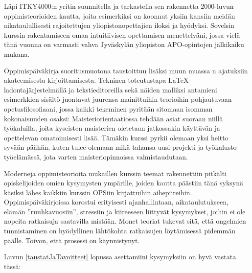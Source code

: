 \documentclass[utf8]{gradu3}
\begin{document}
Läpi ITKY4000:n yritin suunnitella ja tarkastella sen rakennetta
2000-luvun oppimisteorioiden kautta, joita esimerkiksi
\textcite{Illeris2009contemporaryTheories} on koonnut yksiin kansiin
meidän aikataulullisesti rajoitettujen yliopistonopettajien iloksi ja
hyödyksi. Sovelsin kurssin rakentamiseen omaa intuitiivisen
opettamisen menettelyäni, jossa vielä tänä vuonna on varmasti vahva
Jyväskylän yliopiston APO-opintojen
\parencite{LaineMalinen2009elavaPeilisali} jälkikaiku mukana.

Oppimispäiväkirja suoritusmuotona taustoittuu lisäksi muun muassa
\citeauthor{Badley2009shapingAndReshaping}n
\parencite*{Badley2009shapingAndReshaping} ajatuksiin akateemisesta
kirjoittamisesta. Tekninen toteutustapa \LaTeX -ladontajärjestelmällä
ja tekstieditoreilla sekä näiden malliksi antamieni esimerkkien
sisältö juontavat juurensa mainittuihin teorioihin pohjautuvaan
opetusfilosofiaani, jossa kaikki tekeminen pyritään sitomaan isomman
kokonaisuuden osaksi: Maisteriorientaatiossa tehdään asiat suoraan
niillä työkaluilla, joita kyseisten maisterien oletetaan jatkossakin
käyttävän ja opettelevan omatoimisesti lisää. Tämäkin kurssi pyrkii
olemaan yksi heitto syvään päähän, kuten tulee olemaan mikä tahansa
uusi projekti ja työkalusto työelämässä, jota varten
maisteriopinnoissa valmistaudutaan.

Moderneja oppimisteorioita mukaillen kurssin teemat rakennettiin
pitkälti opiskelijoiden omien kysymysten ympärille, joiden kautta
päästiin tänä syksynä käsiksi lähes kaikkiin kurssin OPSiin
kirjattuihin aihepiireihin. Oppimispäiväkirjoissa korostui erityisesti
ajanhallintaan, aikataulutukseen, elämän ''ruuhkavuosiin'', stressiin
ja kiireeseen liittyvät kysymykset, joihin ei ole nopeita ratkaisuja
saatavilla mistään. Monet teoriat
\parencite[edelleen erityisesti][]{Illeris2009contemporaryTheories} tukevat sitä, että
ongelmien tunnistaminen on hyödyllinen lähtökohta ratkaisujen
löytämisessä pidemmän päälle. Toivon, että prosessi on käynnistynyt.

Luvun \ref{taustatJaTavoitteet} lopussa asettamiini kysymyksiin on
hyvä vastata tässä:
\end{document}
